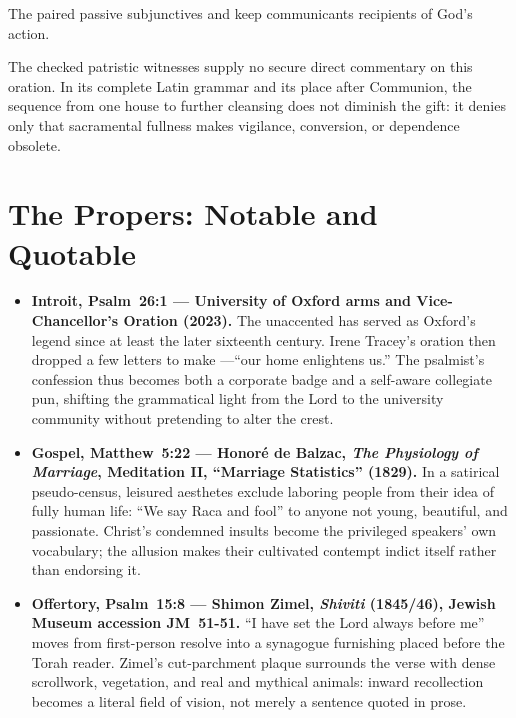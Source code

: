 The paired passive subjunctives  and  keep communicants recipients of God's action.

\noindent The checked patristic witnesses supply no secure direct commentary on this oration. In its complete Latin grammar and its place after Communion, the sequence from one house to further cleansing does not diminish the gift: it denies only that sacramental fullness makes vigilance, conversion, or dependence obsolete.

\sectionguard
\section*{The Propers: Notable and Quotable}

{\small
\begin{itemize}[itemsep=0.35em,topsep=0.2em,parsep=0pt]
\item \textbf{Introit, Psalm~26:1 --- University of Oxford arms and Vice-Chancellor's Oration (2023).} The unaccented  has served as Oxford's legend since at least the later sixteenth century. Irene Tracey's oration then dropped a few letters to make ---``our home enlightens us.'' The psalmist's confession thus becomes both a corporate badge and a self-aware collegiate pun, shifting the grammatical light from the Lord to the university community without pretending to alter the crest.

\item \textbf{Gospel, Matthew~5:22 --- Honoré de Balzac, \emph{The Physiology of Marriage}, Meditation II, ``Marriage Statistics'' (1829).} In a satirical pseudo-census, leisured aesthetes exclude laboring people from their idea of fully human life: ``We say Raca and fool'' to anyone not young, beautiful, and passionate. Christ's condemned insults become the privileged speakers' own vocabulary; the allusion makes their cultivated contempt indict itself rather than endorsing it.

\item \textbf{Offertory, Psalm~15:8 --- Shimon Zimel, \emph{Shiviti} (1845/46), Jewish Museum accession JM~51-51.} ``I have set the Lord always before me'' moves from first-person resolve into a synagogue furnishing placed before the Torah reader. Zimel's cut-parchment plaque surrounds the verse with dense scrollwork, vegetation, and real and mythical animals: inward recollection becomes a literal field of vision, not merely a sentence quoted in prose.
\end{itemize}
}

